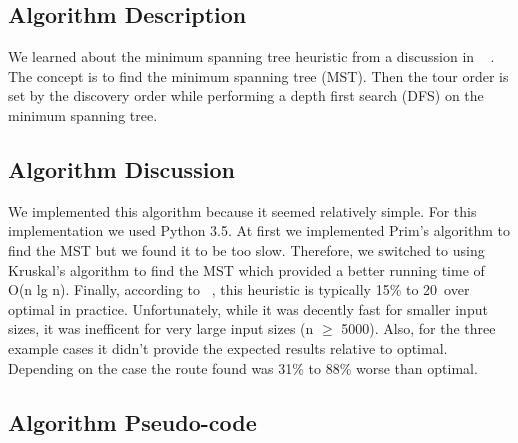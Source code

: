 \documentclass[../report/main.tex]{subfiles}
\begin{document}
\subsection*{Algorithm Description}

We learned about the minimum spanning tree heuristic from a discussion in ~\cite{skiena2008} .  The concept is to find the minimum spanning tree (MST).  Then the tour order is set by the discovery order while performing a depth first search (DFS) on the minimum spanning tree.

\subsection*{Algorithm Discussion}

We implemented this algorithm because it seemed relatively simple.  For this implementation we used Python 3.5.  At first we implemented Prim's algorithm to find the MST but we found it to be too slow.  Therefore, we switched to using Kruskal's algorithm to find the MST which provided a better running time of O(n lg n).  Finally, according to ~\cite{skiena2008}, this heuristic is typically 15\% to 20\ over optimal in practice.  Unfortunately, while it was decently fast for smaller input sizes, it was inefficent for very large input sizes (n $\geq$ 5000).  Also, for the three example cases it didn't provide the expected results relative to optimal.  Depending on the case the route found was 31\% to 88\% worse than optimal. 

\subsection*{Algorithm Pseudo-code}
\end{document}
